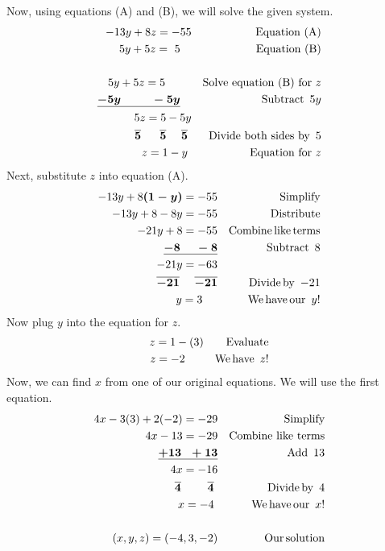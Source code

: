 \begin{example}
	Now, using equations (A) and (B), we will solve the given system.
	\begin{eqnarray*}
	   - 13 y + 8 z = - 55 &  & \text{Equation~(A)}\\
    5 y + 5 z = ~5~~~ &  & \text{Equation~(B)}\\
		&  & \\
    5 y + 5 z = 5~~~~~~~ &  & \text{Solve~equation~(B)~for~} z\\
    \boldsymbol{\underline{- 5 y ~~~~~~~~- 5 y}}~~~ &  & \operatorname{Subtract~} 5 y\\
    5 z = 5 - 5 y &  & \\
    \boldsymbol{\overline{5} ~~~~~ \overline{5} ~~~~ \overline{5}}~ &  & \operatorname{Divide~both~sides~by~} 5\\
    z = 1 - y~ &  & \text{Equation~for~} z
   \end{eqnarray*}
	Next, substitute $z$ into equation (A).
	 \begin{eqnarray*}
		- 13 y + 8 \boldsymbol{(1 - y)} = - 55 &  & \text{Simplify}\\
    - 13 y + 8 - 8 y = - 55 &  & \text{Distribute}\\
    - 21 y + 8 = - 55 &  & \operatorname{Combine} \operatorname{like} \operatorname{terms}\\
    \boldsymbol{\underline{- 8 ~~~~- 8}} &  &  \operatorname{Subtract~} 8\\
    - 21 y = - 63 &  & \\
    \boldsymbol{\overline{- 21} ~~~~ \overline{- 21}} &  & \operatorname{Divide} \operatorname{by~} - 21\\
    y = 3~~~~  &  & \operatorname{We} \operatorname{have} \operatorname{our~} y!
		\end{eqnarray*}
	Now plug $y$ into the equation for $z$.
	 \begin{eqnarray*}
	  z = 1 - (3) &  & \operatorname{Evaluate}\\
    z = - 2~~~~~ &  & \operatorname{We} \operatorname{have~} z!\\
		\end{eqnarray*}
	Now, we can find $x$ from one of our original equations.  We will use the first equation.
		\begin{eqnarray*}
    4 x - 3 (3) + 2 (- 2) = - 29 &  & \text{Simplify}\\
    4 x - 13 = - 29 &  & \text{Combine~like~terms}\\
    \boldsymbol{\underline{+ 13 ~~+ 13}} &  &		\operatorname{Add~} 13\\
    4 x = - 16 &  & \\
    \boldsymbol{\overline{4} ~~~~~~~ \overline{4}}~ &  & \operatorname{Divide} \operatorname{by~} 4\\
    x = - 4~ &  & \operatorname{We} \operatorname{have} \operatorname{our~} x!\\
    &  & \\
    (x,y,z)=(- 4, 3, - 2) &  & \operatorname{Our} \operatorname{solution}
  \end{eqnarray*}
\end{example}
 
